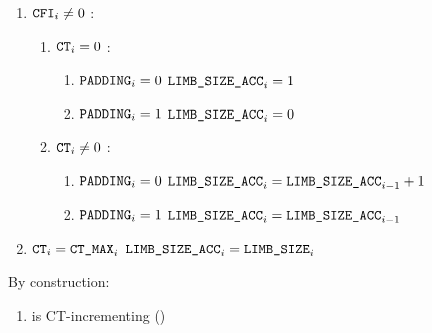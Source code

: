 \begin{enumerate}
	\item \If $\texttt{CFI} _{i} \neq 0$ \Then:
		\begin{enumerate}
			\item \If $\texttt{CT} _{i} = 0$ \Then:
				\begin{enumerate}
					\item \If $\texttt{PADDING} _{i} = 0$ \Then $\texttt{LIMB\_SIZE\_ACC} _{i} = 1$
					\item \If $\texttt{PADDING} _{i} = 1$ \Then $\texttt{LIMB\_SIZE\_ACC} _{i} = 0$
				\end{enumerate}
			\item \If $\texttt{CT} _{i} \neq 0$ \Then:
				\begin{enumerate}
					\item \If $\texttt{PADDING} _{i} = 0$ \Then $\texttt{LIMB\_SIZE\_ACC} _{i} = \texttt{LIMB\_SIZE\_ACC} _{i - 1}+1$
					\item \If $\texttt{PADDING} _{i} = 1$ \Then $\texttt{LIMB\_SIZE\_ACC} _{i} = \texttt{LIMB\_SIZE\_ACC} _{i - 1}$
				\end{enumerate}
		\end{enumerate}
	\item \If $\texttt{CT} _{i} = \texttt{CT\_MAX} _{i}$ \Then $\texttt{LIMB\_SIZE\_ACC} _{i} = \texttt{LIMB\_SIZE} _{i}$
\end{enumerate}
\saNote{} By construction:
\begin{enumerate}[resume]
	\item \romColumnLimbByteSizeAcc{} is CT-incrementing \quad (\trash)
\end{enumerate}
